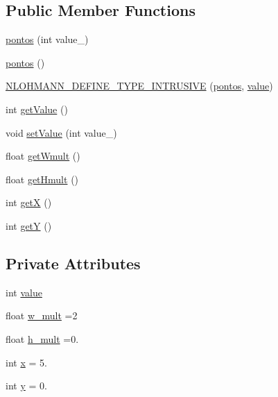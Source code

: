 \subsection*{Public Member Functions}
\begin{DoxyCompactItemize}
\item 
\hyperlink{classpontos_ac2c939539723b5f20054239c0c78ef59}{pontos} (int value\+\_\+)
\item 
\hyperlink{classpontos_aa12034740983c0d4577f45b77d554614}{pontos} ()
\item 
\hyperlink{classpontos_affd7bca089c5a4b687b4cc4faa0ab2ef}{N\+L\+O\+H\+M\+A\+N\+N\+\_\+\+D\+E\+F\+I\+N\+E\+\_\+\+T\+Y\+P\+E\+\_\+\+I\+N\+T\+R\+U\+S\+I\+VE} (\hyperlink{classpontos}{pontos}, \hyperlink{classpontos_a776f5643630f9aec273380a31d0e6e47}{value})
\item 
int \hyperlink{classpontos_a928ec19b58787b0dec93b801a9670070}{get\+Value} ()
\item 
void \hyperlink{classpontos_a75f82ace742aedeb18c05e4130f45951}{set\+Value} (int value\+\_\+)
\item 
float \hyperlink{classpontos_a512205d058f86aa9add643b8e3eb7b37}{get\+Wmult} ()
\item 
float \hyperlink{classpontos_a272201de7460bc20bb297cc45cf09601}{get\+Hmult} ()
\item 
int \hyperlink{classpontos_a9ade2e54b1349e7dfb3a67ced58ab198}{getX} ()
\item 
int \hyperlink{classpontos_add5e95747077e412c6cb3246213427df}{getY} ()
\end{DoxyCompactItemize}
\subsection*{Private Attributes}
\begin{DoxyCompactItemize}
\item 
int \hyperlink{classpontos_a776f5643630f9aec273380a31d0e6e47}{value}
\item 
float \hyperlink{classpontos_a5809900ae2d67c4f1188e4fa7e1e5d85}{w\+\_\+mult} =2
\item 
float \hyperlink{classpontos_a047ccb35d9d6ec355dd75a7651186a2a}{h\+\_\+mult} =0.
\item 
int \hyperlink{classpontos_a8801f4bd9a7391355b70bb23642cc5da}{x} = 5.
\item 
int \hyperlink{classpontos_ac046437304ec67cf1e820775bb74e52e}{y} = 0.
\end{DoxyCompactItemize}



